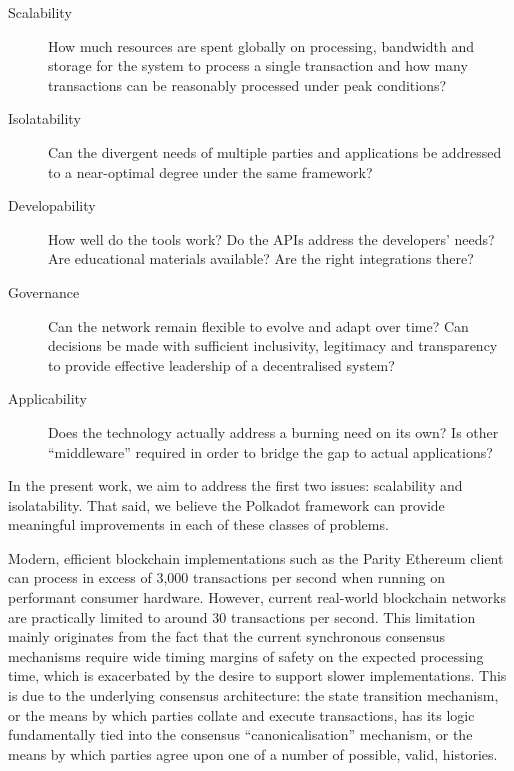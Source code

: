 \documentclass{beamer}
\begin{document}
\begin{frame}
\begin{description}
\item[Scalability] How much resources are spent globally on processing, bandwidth and storage for the system to process a single transaction and how many transactions can be reasonably processed under peak conditions?
\item[Isolatability] Can the divergent needs of multiple parties and applications be addressed to a near-optimal degree under the same framework?
\item[Developability] How well do the tools work? Do the APIs address the developers' needs? Are educational materials available? Are the right integrations there?
\item[Governance] Can the network remain flexible to evolve and adapt over time? Can decisions be made with sufficient inclusivity, legitimacy and transparency to provide effective leadership of a decentralised system?
\item[Applicability] Does the technology actually address a burning need on its own? Is other ``middleware'' required in order to bridge the gap to actual applications?
\end{description}

 In the present work, we aim to address the first two issues: scalability and isolatability. That said, we believe the Polkadot framework can provide meaningful improvements in each of these classes of problems.

Modern, efficient blockchain implementations such as the Parity Ethereum client\cite{parity} can process in excess of 3,000 transactions per second when running on performant consumer hardware. However, current real-world blockchain networks are practically limited to around 30 transactions per second. This limitation mainly originates from the fact that the current synchronous consensus mechanisms require wide timing margins of safety on the expected processing time, which is exacerbated by the desire to support slower implementations. This is due to the underlying consensus architecture: the state transition mechanism, or the means by which parties collate and execute transactions, has its logic fundamentally tied into the consensus ``canonicalisation'' mechanism, or the means by which parties agree upon one of a number of possible, valid, histories.


\end{frame}
\end{document}
